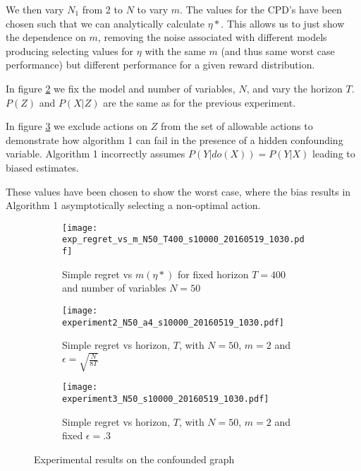 We then vary $N_1$ from 2 to $N$ to vary $m$. The values for the CPD's have been chosen such that we can analytically calculate $\eta*$. This allows us to just show the dependence on $m$, removing the noise associated with different models producing selecting values for $\eta$ with the same $m$ (and thus same worst case performance) but different performance for a given reward distribution. 

In figure \ref{fig:simple_vs_T_general} we fix the model and number of variables, $N$, and vary the horizon $T$. $P(Z)$ and $P(X|Z)$ are the same as for the previous experiment.  

In figure \ref{fig:simple_vs_T_misspecified} we exclude actions on $Z$ from the set of allowable actions to demonstrate how algorithm 1 can fail in the presence of a hidden confounding variable. Algorithm 1 incorrectly assumes $P(Y|do(X)) = P(Y|X)$ leading to biased estimates. 

These values have been chosen to show the worst case, where the bias results in Algorithm 1 asymptotically selecting a non-optimal action.  



\begin{figure}[H]
    \begin{subfigure}[t]{0.3\textwidth}
		\centering    
    		\texttt{[image: exp\_regret\_vs\_m\_N50\_T400\_s10000\_20160519\_1030.pdf]}
    		\caption{Simple regret vs $m(\eta*)$ for fixed horizon $T=400$ and number of variables $N = 50$}
        \label{fig:simple_vs_m_general}
    \end{subfigure}\hfill
    \begin{subfigure}[t]{0.3\textwidth}
    		\centering
        \texttt{[image: experiment2\_N50\_a4\_s10000\_20160519\_1030.pdf]}
    		\caption{Simple regret vs horizon, $T$, with $N = 50$, $m=2$ and $\epsilon = \sqrt{\frac{N}{8T}}$}
        \label{fig:simple_vs_T_general}
    \end{subfigure}\hfill
    \begin{subfigure}[t]{0.3\textwidth}
    		\centering
    		\texttt{[image: experiment3\_N50\_s10000\_20160519\_1030.pdf]}
    		\caption{Simple regret vs horizon, $T$, with $N = 50$, $m=2$ and fixed $\epsilon = .3$}
    		\label{fig:simple_vs_T_misspecified}
    \end{subfigure}
    \caption{Experimental results on the confounded graph}
    \label{fig:experiments}
\end{figure}


